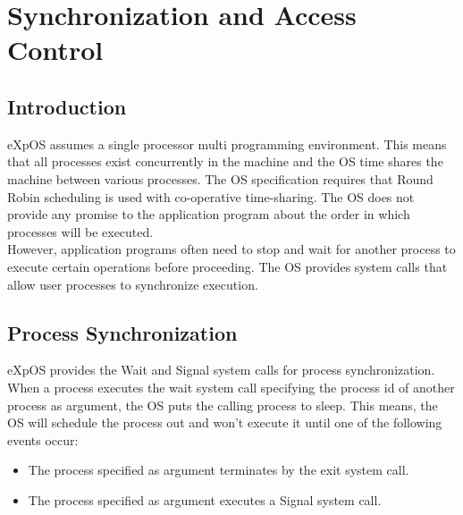 \chapter{Synchronization and Access Control}
\label{chap5}
\section{Introduction}
eXpOS assumes a single processor multi programming environment. This means that all processes exist concurrently in the machine and the OS time shares the machine between various processes. The OS specification requires that Round Robin scheduling is used with co-operative time-sharing. The OS does not provide any promise to the application program about the order in which processes will be executed.
\\
However, application programs often need to stop and wait for another process to execute certain operations before proceeding. The OS provides system calls that allow user processes to synchronize execution.

\section{Process Synchronization}

eXpOS provides the Wait and Signal system calls for process synchronization. When a process executes the wait system call specifying the process id of another process as argument, the OS puts the calling process to sleep. This means, the OS will schedule the process out and won't execute it until one of the following events occur:
\begin{itemize}
\item The process specified as argument terminates by the exit system call.
\item The process specified as argument executes a Signal system call.

\end {itemize}

